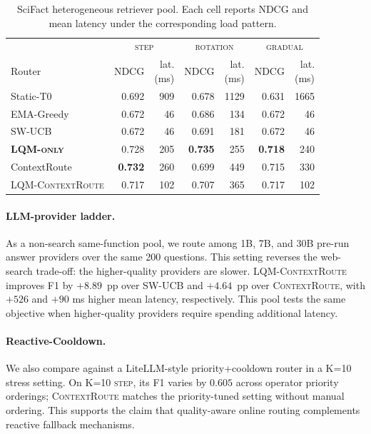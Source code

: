\documentclass[11pt]{article}
\newcommand{\contextroute}{\textsc{ContextRoute}}
\newcommand{\swucb}{\textsc{SW-UCB}}
\newcommand{\lqm}{\textsc{LQM-only}}
\newcommand{\lqmcr}{\textsc{LQM-ContextRoute}}
\begin{document}
\begin{table}[ht]
\centering\scriptsize
\setlength{\tabcolsep}{3pt}
\begin{tabular}{l rr rr rr}
\toprule
& \multicolumn{2}{c}{\textsc{step}}
& \multicolumn{2}{c}{\textsc{rotation}}
& \multicolumn{2}{c}{\textsc{gradual}} \\
Router & NDCG & \shortstack{lat.\\(ms)} & NDCG & \shortstack{lat.\\(ms)}
& NDCG & \shortstack{lat.\\(ms)} \\
\midrule
Static-T0    & 0.692 & 909 & 0.678 & 1129 & 0.631 & 1665 \\
EMA-Greedy   & 0.672 &  46 & 0.686 &  134 & 0.672 &   46 \\
SW-UCB       & 0.672 &  46 & 0.691 &  181 & 0.672 &   46 \\
\textbf{\lqm{}} & 0.728 & 205 & \textbf{0.735} & 255 & \textbf{0.718} & 240 \\
ContextRoute & \textbf{0.732} & 260 & 0.699 & 449 & 0.715 & 330 \\
\lqmcr{}     & 0.717 & 102 & 0.707 & 365 & 0.717 & 102 \\
\bottomrule
\end{tabular}
\caption{SciFact heterogeneous retriever pool. Each cell reports NDCG and mean
latency under the corresponding load pattern.}
\label{tab:scifact}
\end{table}

\paragraph{LLM-provider ladder.}
\label{app:llm-ladder}
As a non-search same-function pool, we route among 1B, 7B, and 30B pre-run answer providers over the same 200 questions. This setting reverses the web-search trade-off: the higher-quality providers are slower. \lqmcr{} improves F1 by $+8.89$~pp over \swucb{} and $+4.64$~pp over \contextroute{}, with $+526$ and $+90$ ms higher mean latency, respectively. This pool tests the same objective when higher-quality providers require spending additional latency.

\paragraph{Reactive-Cooldown.} We also compare against a LiteLLM-style priority+cooldown router in a K=10 stress setting. On K=10 \textsc{step}, its F1 varies by $0.605$ across operator priority orderings; \contextroute{} matches the priority-tuned setting without manual ordering. This supports the claim that quality-aware online routing complements reactive fallback mechanisms.
\end{document}

